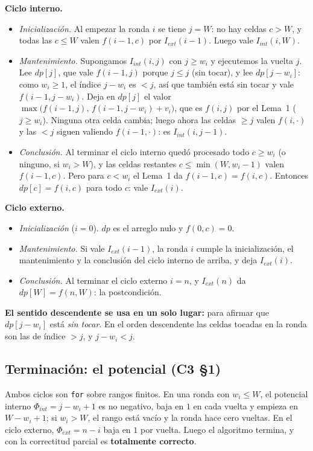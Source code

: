 \documentclass[11pt]{article}
\begin{document}
\textbf{Ciclo interno.}
\begin{itemize}[leftmargin=14pt,itemsep=2pt]
\item \emph{Inicialización.} Al empezar la ronda $i$ se tiene $j=W$: no hay celdas $c>W$, y todas las
$c\le W$ valen $f(i-1,c)$ por $I_{ext}(i-1)$. Luego vale $I_{int}(i,W)$.
\item \emph{Mantenimiento.} Supongamos $I_{int}(i,j)$ con $j\ge w_i$ y ejecutemos la vuelta $j$. Lee $dp[j]$,
que vale $f(i-1,j)$ porque $j\le j$ (sin tocar), y lee $dp[j-w_i]$: como $w_i\ge1$, el índice $j-w_i$ es
$<j$, así que también está sin tocar y vale $f(i-1,j-w_i)$. Deja en $dp[j]$ el valor
$\max\bigl(f(i-1,j),\,f(i-1,j-w_i)+v_i\bigr)$, que es $f(i,j)$ por el Lema~1 ($j\ge w_i$). Ninguna otra celda
cambia; luego ahora las celdas $\ge j$ valen $f(i,\cdot)$ y las $<j$ siguen valiendo $f(i-1,\cdot)$: es
$I_{int}(i,j-1)$.
\item \emph{Conclusión.} Al terminar el ciclo interno quedó procesado todo $c\ge w_i$ (o ninguno, si
$w_i>W$), y las celdas restantes $c\le\min(W,w_i-1)$ valen $f(i-1,c)$. Pero para $c<w_i$ el Lema~1 da
$f(i-1,c)=f(i,c)$. Entonces $dp[c]=f(i,c)$ para todo $c$: vale $I_{ext}(i)$.
\end{itemize}

\textbf{Ciclo externo.}
\begin{itemize}[leftmargin=14pt,itemsep=2pt]
\item \emph{Inicialización} ($i=0$). $dp$ es el arreglo nulo y $f(0,c)=0$.
\item \emph{Mantenimiento.} Si vale $I_{ext}(i-1)$, la ronda $i$ cumple la inicialización, el mantenimiento y la
conclusión del ciclo interno de arriba, y deja $I_{ext}(i)$.
\item \emph{Conclusión.} Al terminar el ciclo externo $i=n$, y $I_{ext}(n)$ da $dp[W]=f(n,W)$: la
postcondición.
\end{itemize}
\textbf{El sentido descendente se usa en un solo lugar:} para afirmar que $dp[j-w_i]$ está \emph{sin tocar}.
En el orden descendente las celdas tocadas en la ronda son las de índice $>j$, y $j-w_i<j$.

\subsection*{Terminación: el potencial (C3 §1)}

Ambos ciclos son \texttt{for} sobre rangos finitos. En una ronda con $w_i\le W$, el potencial interno
$\Phi_{int}=j-w_i+1$ es no negativo, baja en $1$ en cada vuelta y empieza en $W-w_i+1$; si $w_i>W$,
el rango está vacío y la ronda hace cero vueltas. En el ciclo externo, $\Phi_{ext}=n-i$ baja en $1$
por vuelta. Luego el algoritmo termina, y con la correctitud parcial es \textbf{totalmente correcto}.
\end{document}
